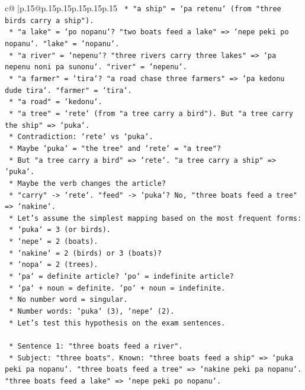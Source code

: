 \documentclass{article}
\begin{document}
{\begin{supertabular}{c@{$\;$}|p{.15\linewidth}@{}p{.15\linewidth}p{.15\linewidth}p{.15\linewidth}p{.15\linewidth}p{.15\linewidth}}
{{{\texttt{    *   "a ship" = `pa retenu` (from "three birds carry a ship").} \\
\texttt{    *   "a lake" = `po nopanu`? "two boats feed a lake" => `nepe peki po nopanu`. "lake" = `nopanu`.} \\
\texttt{    *   "a river" = `nepenu`? "three rivers carry three lakes" => `pa nepenu noni pa sunonu`. "river" = `nepenu`.} \\
\texttt{    *   "a farmer" = `tira`? "a road chase three farmers" => `pa kedonu dude tira`. "farmer" = `tira`.} \\
\texttt{    *   "a road" = `kedonu`.} \\
\texttt{    *   "a tree" = `rete` (from "a tree carry a bird"). But "a tree carry the ship" => `puka`.} \\
\texttt{    *   Contradiction: `rete` vs `puka`.} \\
\texttt{    *   Maybe `puka` = "the tree" and `rete` = "a tree"?} \\
\texttt{    *   But "a tree carry a bird" => `rete`. "a tree carry a ship" => `puka`.} \\
\texttt{    *   Maybe the verb changes the article?} \\
\texttt{    *   "carry" {-}> `rete`. "feed" {-}> `puka`? No, "three boats feed a tree" => `nakine`.} \\
\texttt{    *   Let's assume the simplest mapping based on the most frequent forms:} \\
\texttt{        *   `puka` = 3 (or birds).} \\
\texttt{        *   `nepe` = 2 (boats).} \\
\texttt{        *   `nakine` = 2 (birds) or 3 (boats)?} \\
\texttt{        *   `nopa` = 2 (trees).} \\
\texttt{        *   `pa` = definite article? `po` = indefinite article?} \\
\texttt{        *   `pa` + noun = definite. `po` + noun = indefinite.} \\
\texttt{        *   No number word = singular.} \\
\texttt{        *   Number words: `puka` (3), `nepe` (2).} \\
\texttt{        *   Let's test this hypothesis on the exam sentences.} \\
\\ 
\texttt{    *   Sentence 1: "three boats feed a river".} \\
\texttt{        *   Subject: "three boats". Known: "three boats feed a ship" => `puka peki pa nopanu`. "three boats feed a tree" => `nakine peki pa nopanu`. "three boats feed a lake" => `nepe peki po nopanu`.} \\
}}}
\end{supertabular}}
\end{document}
